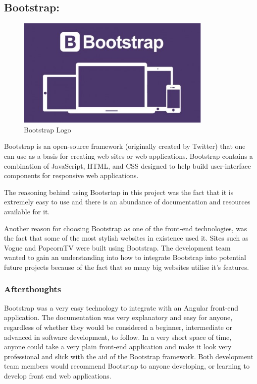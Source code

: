 \subsection{Bootstrap:}
\label{sec:TechnologyReviewBootstrap}

\begin{figure}[H]
    \centering
    \includegraphics[width=\textwidth, height=150pt]{img/BootStrapLogo.PNG}
    \caption{Bootstrap Logo}
    \label{fig:my_label}
\end{figure}

\bigskip

Bootstrap is an open-source framework (originally created by Twitter) that one can use as a basis for creating web sites or web applications. Bootstrap contains a combination of JavaScript, HTML, and CSS designed to help build user-interface components for responsive web applications. 

\bigskip

The reasoning behind using Bootsrtap in this project was the fact that it is extremely easy to use and there is an abundance of documentation and resources available for it.

Another reason for choosing Bootstrap as one of the front-end technologies, was the fact that some of the most stylish websites in existence used it. Sites such as Vogue and PopcornTV were built using Bootstrap.  The development team wanted to gain an understanding into how to integrate Bootstrap into potential future projects because of the fact that so many big websites utilise it's features. 

\bigskip

\subsubsection{Afterthoughts}

Bootstrap was a very easy technology to integrate with an Angular front-end application. The documentation was very explanatory and easy for anyone, regardless of whether they would be considered a beginner, intermediate or advanced in software development, to follow. In a very short space of time, anyone could take a very plain front-end application and make it look very professional and slick with the aid of the Bootstrap framework. Both development team members would recommend Bootsrtap to anyone developing, or learning to develop front end web applications. 


